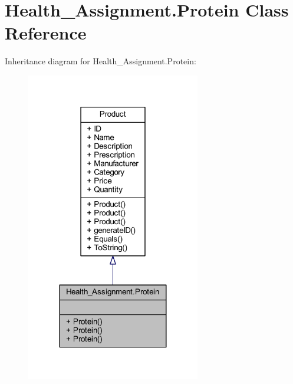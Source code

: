 \hypertarget{class_health___assignment_1_1_protein}{}\section{Health\+\_\+\+Assignment.\+Protein Class Reference}
\label{class_health___assignment_1_1_protein}


Inheritance diagram for Health\+\_\+\+Assignment.\+Protein\+:\nopagebreak
\begin{figure}[H]
\begin{center}
\leavevmode
\includegraphics[width=215pt]{class_health___assignment_1_1_protein__inherit__graph}
\end{center}
\end{figure}



